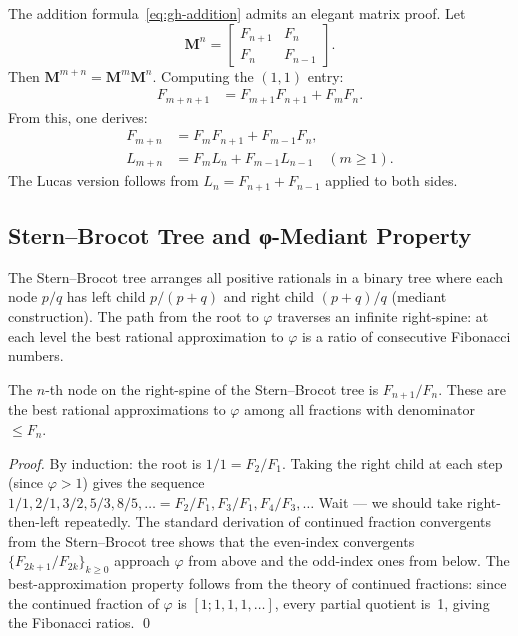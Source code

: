 The addition formula~\eqref{eq:gh-addition} admits an elegant
matrix proof.  Let
\[
  \mathbf{M}^n = \begin{bmatrix} F_{n+1} & F_n \\ F_n & F_{n-1} \end{bmatrix}.
\]
Then \(\mathbf{M}^{m+n} = \mathbf{M}^m \mathbf{M}^n\).
Computing the \((1,1)\) entry:
\begin{align*}
  F_{m+n+1}
  &= F_{m+1}F_{n+1} + F_m F_n.
\end{align*}
From this, one derives:
\begin{align*}
  F_{m+n} &= F_m F_{n+1} + F_{m-1} F_n, \\
  L_{m+n} &= F_m L_n + F_{m-1}L_{n-1}     \quad (m \geq 1).
\end{align*}
The Lucas version follows from \(L_n = F_{n+1} + F_{n-1}\) applied
to both sides.

\subsection{Stern--Brocot Tree and φ-Mediant Property}
\label{subsec:gh-stern-brocot}

The Stern--Brocot tree arranges all positive rationals in a binary
tree where each node \(p/q\) has left child
\(p/(p+q)\) and right child \((p+q)/q\) (mediant construction).
The path from the root to \(\varphi\) traverses an infinite
right-spine: at each level the best rational approximation to \(\varphi\)
is a ratio of consecutive Fibonacci numbers.

\begin{proposition}
\label{prop:gh-sb}
The \(n\)-th node on the right-spine of the Stern--Brocot tree is
\(F_{n+1}/F_n\).  These are the best rational approximations to
\(\varphi\) among all fractions with denominator \(\leq F_n\).
\end{proposition}
\begin{proof}
By induction: the root is \(1/1 = F_2/F_1\). Taking the right child
at each step (since \(\varphi > 1\)) gives the sequence
\(1/1, 2/1, 3/2, 5/3, 8/5, \ldots = F_2/F_1, F_3/F_1, F_4/F_3, \ldots\)
Wait — we should take right-then-left repeatedly. The standard
derivation of continued fraction convergents from the Stern--Brocot
tree shows that the even-index convergents
\(\{F_{2k+1}/F_{2k}\}_{k \geq 0}\) approach \(\varphi\) from above
and the odd-index ones from below.  The best-approximation property
follows from the theory of continued fractions: since the continued
fraction of \(\varphi\) is \([1;1,1,1,\ldots]\), every partial
quotient is~1, giving the Fibonacci ratios.
\qed
\end{proof}

